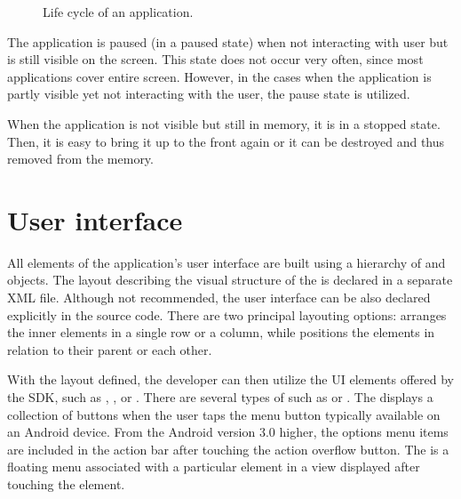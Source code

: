 \begin{figure}[h!]
    \caption{Life cycle of an application.}
\end{figure}

The application is paused (in a paused state) when not interacting with user but is still visible on the screen.
This state does not occur very often, since most applications cover entire screen.
However, in the cases when the application is partly visible yet not interacting with the user, the pause state is utilized. 

When the application is not visible but still in memory, it is in a stopped state.
Then, it is easy to bring it up to the front again or it can be destroyed and thus removed from the memory.

\section{User interface}
\label{sec:ui}

All elements of the application's user interface are built using a hierarchy of  and  objects.
The layout describing the visual structure of the  is declared in a separate XML file.
Although not recommended, the user interface can be also declared explicitly in the source code. 
There are two principal layouting options:  arranges the inner elements in a single row or a column,
while  positions the elements in relation to their parent or each other.

With the layout defined, the developer can then utilize the UI elements offered by the SDK, such as , ,  or .
There are several types of  such as  or . %
The  displays a collection of buttons when the user taps the menu button typically available on an Android device. 
From the Android version 3\@.0 higher, the options menu items are included in the action bar after touching the action overflow button. %
The  is a floating menu associated with a particular element in a view displayed after touching the element.


